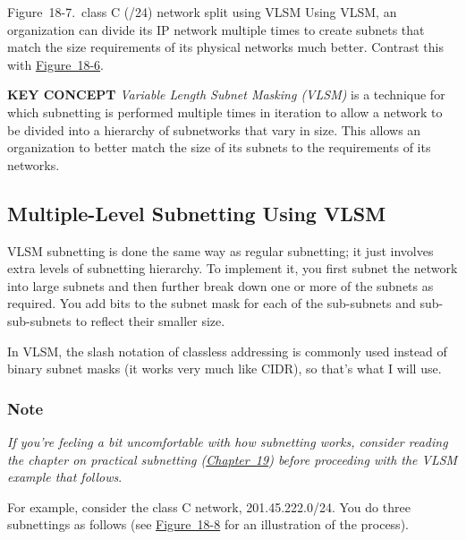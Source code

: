 
Figure~18-7.~class C (/24) network split using VLSM Using VLSM, an
organization can divide its IP network multiple times to create subnets
that match the size requirements of its physical networks much better.
Contrast this with
\protect\hyperlink{ch18s08.htmlux5cux23class_c_24_network_split_into_eight_conv}{Figure~18-6}.


{\textbf{KEY
CONCEPT}} {\emph{Variable Length Subnet Masking (VLSM)}} is a technique
for which subnetting is performed multiple times in iteration to allow a
network to be divided into a hierarchy of subnetworks that vary in size.
This allows an organization to better match the size of its subnets to
the requirements of its networks.

\subsection[Multiple-Level Subnetting Using
VLSM]{\texorpdfstring{Multiple-Level
Subnetting Using VLSM}{Multiple-Level Subnetting Using VLSM}}

VLSM subnetting is done the same way as regular subnetting; it just
involves extra levels of subnetting hierarchy. To implement it, you
first subnet the network into large subnets and then further break down
one or more of the subnets as required. You add bits to the subnet mask
for each of the sub-subnets and sub-sub-subnets to reflect their smaller
size.

In VLSM, the slash notation of classless addressing is commonly used
instead of binary subnet masks (it works very much like CIDR), so that's
what I will use.

\subsubsection[Note]{\texorpdfstring{Note}{Note}}

{\emph{If you're feeling a bit uncomfortable with how subnetting works,
consider reading the chapter on practical subnetting
(\protect\hyperlink{ch19.html}{Chapter~19}) before proceeding with the
VLSM example that follows}}.

For example, consider the class C network, 201.45.222.0/24. You do three
subnettings as follows (see
\protect\hyperlink{ch18s08.htmlux5cux23vlsm_example_this_diagram_illustrates_th}{Figure~18-8}
for an illustration of the process).




